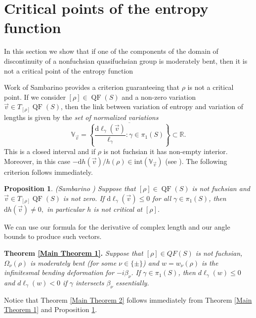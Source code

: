 \documentclass{amsart}
\theoremstyle{plain}
\newtheorem{proposition}{Proposition}[section]
\theoremstyle{definition}
\theoremstyle{remark}
\newcommand{\R}{\mathbb R}
\newcommand{\QF}{\operatorname{QF}}
\newcommand{\<}{\left <}
\renewcommand{\>}{\right >}
\newcommand{\g}{\gamma}
\newcommand{\dd}{{\mathrm{d}}}
\begin{document}
\section{Critical points of the entropy function}
\label{entropy}

In this section we show that if one of the components of the domain of discontinuity of a nonfuchsian quasifuchsian group
is moderately bent, then it is not a critical point of the entropy function

Work of Sambarino \cite{sambarino} provides a criterion guaranteeing that $\rho$ is not a critical point.
If we consider $[\rho]\in \QF(S)$ and a non-zero variation $\vec v\in T_{[\rho]} \QF(S)$,
then the link between variation of entropy and variation of lengths is given by the \emph{set of normalized variations}
$$\mathbb V_{\vec v}=\overline{\left\{\frac{\dd\ell_\g(\vec v)}{\ell_\g}:\g\in\pi_1(S)\right\}}\subset\R.$$ 
This is a closed interval and if $\rho$ is not fuchsian  it has non-empty interior. 
Moreover, in this case $-\dd h(\vec v)/h(\rho) \in\mathrm{int}(\mathbb V_{\vec v})$ (see \cite[Lemma 2.32]{sambarino}).  
The following criterion follows immediately.


\begin{proposition}{\rm (Sambarino \cite{sambarino})}
\label{critical point fact} 
Suppose that $[\rho]\in \QF(S)$ is not fuchsian and $\vec v\in T_{[\rho]} \QF(S)$ is not zero. 
If $\dd\ell_\g(\vec v)\leq0$ for all $\g\in\pi_1(S)$, then $\dd h(\vec v)\neq0,$ in particular $h$ is not critical at $[\rho].$
\end{proposition}

We can use our formula for the derivative of complex length and our angle bounds to produce such vectors.

\medskip\noindent
{\bf Theorem \ref{Main Theorem 1}.} {\em
Suppose that $[\rho]\in QF(S)$ is not fuchsian, $\Omega_\nu(\rho)$ is moderately bent (for some $\nu\in\{\pm\}$) and
$w=w_\nu(\rho)$ is the infinitesmal bending deformation for $-i\beta_\nu$.
If $\gamma\in \pi_1(S)$, then $d\ell_\gamma(w)\le 0$ and $d\ell_\gamma(w)  < 0$ if  $\gamma$ intersects $\beta_\nu$ essentially.}

\medskip

Notice that Theorem \ref{Main Theorem 2} follows immediately from Theorem \ref{Main Theorem 1} and Proposition \ref{critical point fact}.
\end{document}
